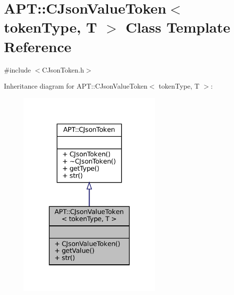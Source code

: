 \hypertarget{classAPT_1_1CJsonValueToken}{}\section{A\+PT\+:\+:C\+Json\+Value\+Token$<$ token\+Type, T $>$ Class Template Reference}
\label{classAPT_1_1CJsonValueToken}


{\ttfamily \#include $<$C\+Json\+Token.\+h$>$}



Inheritance diagram for A\+PT\+:\+:C\+Json\+Value\+Token$<$ token\+Type, T $>$\+:
\nopagebreak
\begin{figure}[H]
\begin{center}
\leavevmode
\includegraphics[width=203pt]{classAPT_1_1CJsonValueToken__inherit__graph}
\end{center}
\end{figure}


